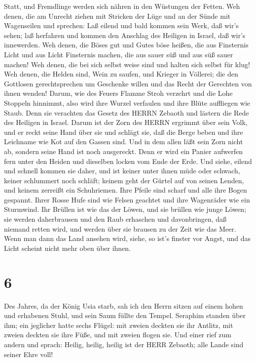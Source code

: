 Statt, und Fremdlinge werden sich nähren in den Wüstungen der Fetten.
 Weh denen, die am Unrecht ziehen mit Stricken der Lüge und
an der Sünde mit Wagenseilen  und sprechen: Laß eilend und
bald kommen sein Werk, daß wir's sehen; laß herfahren und kommen den
Anschlag des Heiligen in Israel, daß wir's innewerden.  Weh
denen, die Böses gut und Gutes böse heißen, die aus Finsternis Licht und
aus Licht Finsternis machen, die aus sauer süß und aus süß sauer machen!
 Weh denen, die bei sich selbst weise sind und halten sich
selbst für klug!  Weh denen, die Helden sind, Wein zu
saufen, und Krieger in Völlerei;  die den Gottlosen
gerechtsprechen um Geschenke willen und das Recht der Gerechten von
ihnen wenden!  Darum, wie des Feuers Flamme Stroh verzehrt
und die Lohe Stoppeln hinnimmt, also wird ihre Wurzel verfaulen und ihre
Blüte auffliegen wie Staub. Denn sie verachten das Gesetz des HERRN
Zebaoth und lästern die Rede des Heiligen in Israel.  Darum
ist der Zorn des HERRN ergrimmt über sein Volk, und er reckt seine Hand
über sie und schlägt sie, daß die Berge beben und ihre Leichname wie Kot
auf den Gassen sind. Und in dem allen läßt sein Zorn nicht ab, sondern
seine Hand ist noch ausgereckt.  Denn er wird ein Panier
aufwerfen fern unter den Heiden und dieselben locken vom Ende der Erde.
Und siehe, eilend und schnell kommen sie daher,  und ist
keiner unter ihnen müde oder schwach, keiner schlummert noch schläft;
keinem geht der Gürtel auf von seinen Lenden, und keinem zerreißt ein
Schuhriemen.  Ihre Pfeile sind scharf und alle ihre Bogen
gespannt. Ihrer Rosse Hufe sind wie Felsen geachtet und ihre Wagenräder
wie ein Sturmwind.  Ihr Brüllen ist wie das der Löwen, und
sie brüllen wie junge Löwen; sie werden daherbrausen und den Raub
erhaschen und davonbringen, daß niemand retten wird,  und
werden über sie brausen zu der Zeit wie das Meer. Wenn man dann das Land
ansehen wird, siehe, so ist's finster vor Angst, und das Licht scheint
nicht mehr oben über ihnen.

\hypertarget{section-5}{%
\section{6}\label{section-5}}

 Des Jahres, da der König Usia starb, sah ich den Herrn
sitzen auf einem hohen und erhabenen Stuhl, und sein Saum füllte den
Tempel.  Seraphim standen über ihm; ein jeglicher hatte
sechs Flügel: mit zweien deckten sie ihr Antlitz, mit zweien deckten sie
ihre Füße, und mit zweien flogen sie.  Und einer rief zum
andern und sprach: Heilig, heilig, heilig ist der HERR Zebaoth; alle
Lande sind seiner Ehre voll!

